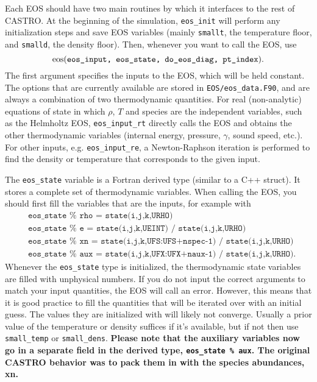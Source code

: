 Each EOS should have two main routines by which it interfaces to the
rest of CASTRO.  At the beginning of the simulation, {\tt eos\_init}
will perform any initialization steps and save EOS variables (mainly
\texttt{smallt}, the temperature floor, and \texttt{smalld}, the
density floor). Then, whenever you want to call the EOS, use
\[
{\bf \rm eos}(\texttt{eos\_input, eos\_state, do\_eos\_diag, pt\_index}).
\]
The first argument specifies the inputs to the EOS, which will be held constant. The options that are currently available are stored in \texttt{EOS/eos\_data.F90}, and are always a combination of two thermodynamic quantities. For real (non-analytic) equations of state in which $\rho$, $T$ and species are the independent variables, such as the Helmholtz EOS, \texttt{eos\_input\_rt} directly calls the EOS and obtains the other thermodynamic variables (internal energy, pressure, $\gamma$, sound speed, etc.). For other inputs, e.g. \texttt{eos\_input\_re}, a Newton-Raphson iteration is performed to find the density or temperature that corresponds to the given input.

The \texttt{eos\_state} variable is a Fortran derived type (similar to a C++ struct). It stores a complete set of thermodynamic variables. When calling the EOS, you should first fill the variables that are the inputs, for example with
\begin{align*}
  &\texttt{eos\_state } \% \texttt{ rho = state(i,j,k,URHO)} \\
  &\texttt{eos\_state } \% \texttt{ e   = state(i,j,k,UEINT) / state(i,j,k,URHO)} \\
  &\texttt{eos\_state } \% \texttt{ xn  = state(i,j,k,UFS:UFS+nspec-1) / state(i,j,k,URHO)} \\
  &\texttt{eos\_state } \% \texttt{ aux = state(i,j,k,UFX:UFX+naux-1) / state(i,j,k,URHO)}.
\end{align*}
Whenever the \texttt{eos\_state} type is initialized, the
thermodynamic state variables are filled with unphysical numbers. If
you do not input the correct arguments to match your input quantities,
the EOS will call an error. However, this means that it is good
practice to fill the quantities that will be iterated over with an
initial guess. The values they are initialized with will likely not
converge. Usually a prior value of the temperature or density suffices
if it's available, but if not then use \texttt{small\_temp} or
\texttt{small\_dens}. \textbf{Please note that the auxiliary variables
  now go in a separate field in the derived type, {\tt eos\_state \%
  aux}. The original CASTRO behavior was to pack them in with the
  species abundances, xn.}

